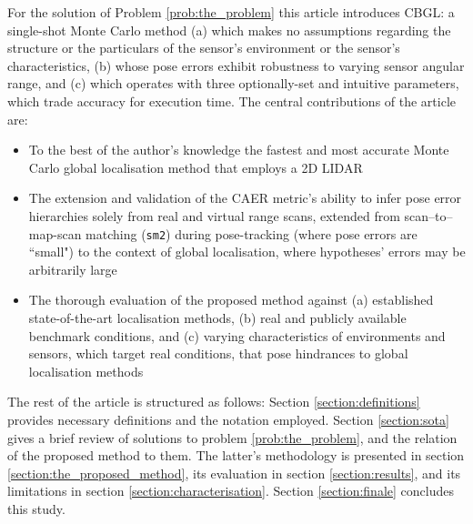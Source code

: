 For the solution of Problem \ref{prob:the_problem} this article introduces
CBGL: a single-shot Monte Carlo method
(a) which makes no assumptions regarding the structure or the particulars of the
sensor's environment or the sensor's characteristics,
(b) whose pose errors exhibit robustness to varying sensor angular range, and
(c) which operates with three optionally-set and intuitive parameters, which
trade accuracy for execution time.
The central contributions of the article are:
\begin{itemize}
  \item To the best of the author's knowledge the fastest and most accurate
        Monte Carlo global localisation method that employs a 2D LIDAR
  \item The extension and validation of the CAER metric's ability to infer
        pose error hierarchies solely from real and virtual range scans,
        extended from scan--to--map-scan matching (\texttt{sm2}) during
        pose-tracking (where pose errors are ``small") to the context of
        global localisation, where hypotheses' errors may be arbitrarily large
  \item The thorough evaluation of the proposed method against (a) established
        state-of-the-art localisation methods, (b) real and publicly available
        benchmark conditions, and (c) varying characteristics of environments
        and sensors, which target real conditions, that pose hindrances to
        global localisation methods
\end{itemize}

The rest of the article is structured as follows: Section
\ref{section:definitions} provides necessary definitions and the notation
employed. Section \ref{section:sota} gives a brief review of
solutions to problem \ref{prob:the_problem}, and the relation of the proposed
method to them. The latter's methodology is presented in section
\ref{section:the_proposed_method}, its evaluation in section
\ref{section:results}, and its limitations in section
\ref{section:characterisation}. Section \ref{section:finale} concludes this
study.
